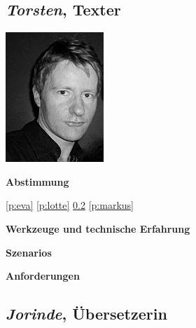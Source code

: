 \pagebreak

\subsection{\emph{Torsten}, Texter}\label{p:torsten}

\begin{multicols}{2}

\begin{center}
\includegraphics[width=0.5\columnwidth]{media/torsten.jpg}
\end{center}


\textbf{Abstimmung}

\ref{p:eva}
\ref{p:lotte}
\ref{p:jorinde}
\ref{p:markus}

\textbf{Werkzeuge und technische Erfahrung}

\columnbreak

\textbf{Szenarios}

\textbf{Anforderungen}

\end{multicols}

\pagebreak

\subsection{\emph{Jorinde}, Übersetzerin}\label{p:jorinde}

